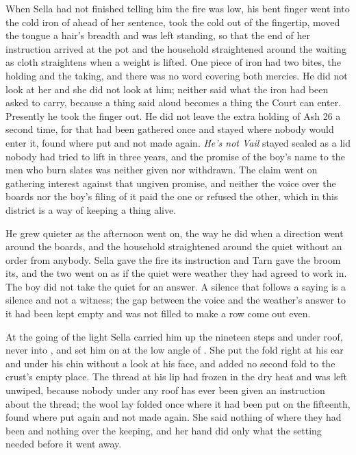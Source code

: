 When Sella had not finished telling him the fire was low, his bent finger went into the cold iron of  ahead of her sentence, took the cold out of the fingertip, moved the tongue a hair's breadth and was left standing, so that the end of her instruction arrived at the pot and the household straightened around the waiting as cloth straightens when a weight is lifted. One piece of iron had two bites, the holding and the taking, and there was no  word covering both mercies. He did not look at her and she did not look at him; neither said what the iron had been asked to carry, because a thing said aloud becomes a thing the Court can enter. Presently he took the finger out. He did not leave the extra holding of Ash 26 a second time, for that had been gathered once and stayed where nobody would enter it, found where put and not made again. \emph{He's not Vail} stayed sealed as a lid nobody had tried to lift in three years, and the promise of the boy's name to the men who burn slates was neither given nor withdrawn. The claim went on gathering interest against that ungiven promise, and neither the voice over the boards nor the boy's filing of it paid the one or refused the other, which in this district is a way of keeping a thing alive.

He grew quieter as the afternoon went on, the way he did when a direction went around the boards, and the household straightened around the quiet without an order from anybody. Sella gave the fire its instruction and Tarn gave the broom its, and the two went on as if the quiet were weather they had agreed to work in. The boy did not take the quiet for an answer. A silence that follows a saying is a silence and not a witness; the gap between the voice and the weather's answer to it had been kept empty and was not filled to make a row come out even.

\scenebreak

At the going of the light Sella carried him up the nineteen steps and under  roof, never into , and set him on  at the low angle of . She put the fold right at his ear and under his chin without a look at his face, and added no second fold to the crust's empty place. The thread at his lip had frozen in the dry heat and was left unwiped, because nobody under any roof has ever been given an instruction about the thread; the wool lay folded once where it had been put on the fifteenth, found where put again and not made again. She said nothing of where they had been and nothing over the keeping, and her hand did only what the setting needed before it went away.


